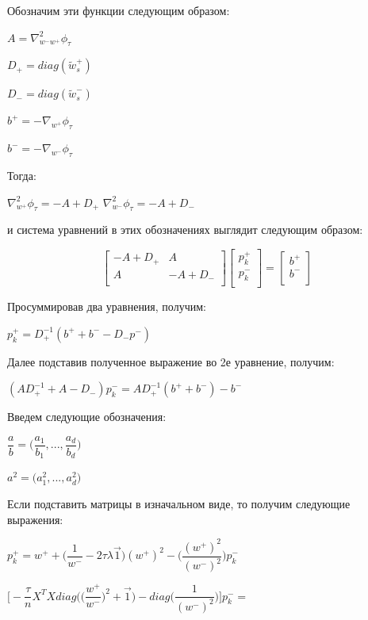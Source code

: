 \documentclass[12pt, a4paper]{article}
\begin{document}
    \medskip

    Обозначим эти функции следующим образом:

    $A = \nabla_{w^-w^+}^2 \phi_\tau$

    $D_+ = diag(\widetilde{w}_s^+)$

    $D_- = diag(\widetilde{w}_s^-)$

    $b^+ = -\nabla_{w^+} \phi_\tau$

    $b^- = -\nabla_{w^-} \phi_\tau$

    Тогда:

    $\nabla_{w^+}^2 \phi_\tau = -A + D_+$
    $\nabla_{w^-}^2 \phi_\tau = -A + D_-$

    и система уравнений в этих обозначениях выглядит следующим образом:

    $$
    \begin{bmatrix}
        -A + D_+ & A \\[0.3em]
        A & -A + D_- \\[0.3em]
    \end{bmatrix}
    \begin{bmatrix}
        p_k^+ \\[0.3em]
        p_k^- \\[0.3em]
    \end{bmatrix}
    =
    \begin{bmatrix}
        b^+ \\[0.3em]
        b^- \\[0.3em]
    \end{bmatrix}
    $$

    Просуммировав два уравнения, получим:

    $p_k^+ = D_+^{-1}(b^+ + b^- - D_-p^-)$

    Далее подставив полученное выражение во 2е уравнение, получим:

    $(AD_+^{-1} + A - D_-)p_k^- = AD_+^{-1}(b^+ + b^-) - b^-$

    Введем следующие обозначения:

    $\dfrac{a}{b} = \Big(\dfrac{a_1}{b_1}, ..., \dfrac{a_d}{b_d}\Big)$

    $a^2 = \Big(a_1^2, ..., a_d^2\Big)$

    Если подставить матрицы в изначальном виде, то получим следующие выражения:

    $p_k^+ = w^+ + \Big(\dfrac{1}{w^-} - 2\tau\lambda\vec{1}\Big) (w^+)^2 - \Big(\dfrac{(w^+)^2}{(w^-)^2}\Big)p_k^-$

    $\Big[-\dfrac{\tau}{n}X^T X diag\Big( \Big(\dfrac{w^+}{w^-}\Big)^2 + \vec{1} \Big) - diag\Big( \dfrac{1}{(w^-)^2} \Big) \Big]p_k^- =$
\end{document}
